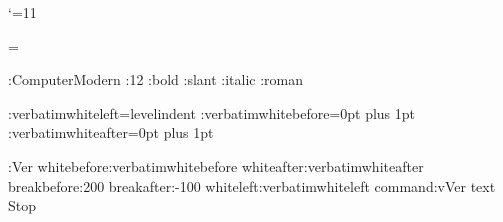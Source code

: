 %
%
%
%
%
%
%
%
\catcode`\@=11























  
\errorcontextlines=\maxdimen

\let\willbeunhskip\unhskip

\Typeface:ComputerModern
\Pointsize:12
\Style:bold \Style:slant \Style:italic \Style:roman

\Distance:verbatimwhiteleft=levelindent
\Distance:verbatimwhitebefore={0pt plus 1pt}
\Distance:verbatimwhiteafter={0pt plus 1pt}

\DefineTextBlock:Ver 
    whitebefore:verbatimwhitebefore whiteafter:verbatimwhiteafter
    breakbefore:200 breakafter:-100
    whiteleft:verbatimwhiteleft
    command:vVer text Stop

